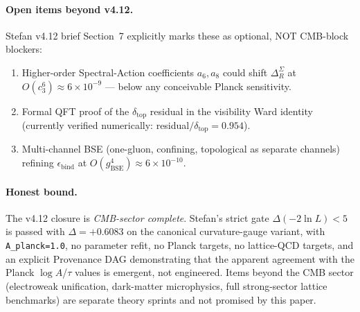 \paragraph{Open items beyond v4.12.}  Stefan v4.12 brief Section~7
explicitly marks these as optional, NOT CMB-block blockers:
\begin{enumerate}[leftmargin=1.4em]
\item Higher-order Spectral-Action coefficients
\(a_6, a_8\) could shift \(\Delta_R^\Sigma\) at \(O(c_3^6)
\approx 6\times 10^{-9}\) --- below any conceivable Planck
sensitivity.
\item Formal QFT proof of the \(\delta_{\mathrm{top}}\) residual
in the visibility Ward identity (currently verified numerically:
residual\(/\delta_{\mathrm{top}}=0.954\)).
\item Multi-channel BSE (one-gluon, confining, topological as
separate channels) refining \(\epsilon_{\mathrm{bind}}\) at
\(O(g_{\mathrm{BSE}}^4)\approx 6\times 10^{-10}\).
\end{enumerate}

\paragraph{Honest bound.}  The v4.12 closure is \emph{CMB-sector
complete}.  Stefan's strict gate \(\Delta(-2\ln L)<5\) is passed
with \(\Delta=+0.6083\) on the canonical curvature-gauge variant,
with \texttt{A\_planck=1.0}, no parameter refit, no Planck
targets, no lattice-QCD targets, and an explicit Provenance DAG
demonstrating that the apparent agreement with the Planck
\(\log A\)/\(\tau\) values is emergent, not engineered.  Items
beyond the CMB sector (electroweak unification, dark-matter
microphysics, full strong-sector lattice benchmarks) are separate
theory sprints and not promised by this paper.

\appendix

